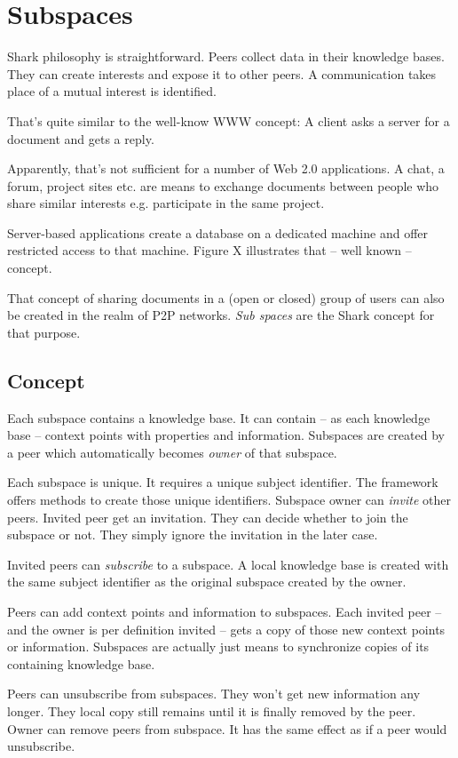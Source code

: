\chapter{Subspaces}
Shark philosophy is straightforward. Peers collect data in their
knowledge bases. They can create interests and expose it to other 
peers. A communication takes place of a mutual interest is identified.

That's quite similar to the well-know WWW concept: A client asks a 
server for a document and gets a reply.

Apparently, that's not sufficient for a number of Web 2.0 applications.
A chat, a forum, project sites etc. are means to exchange documents 
between people who share similar interests e.g. participate in the same
project.

Server-based applications create a database on a dedicated machine
and offer restricted access to that machine. Figure X illustrates that
-- well known -- concept.

That concept of sharing documents in a (open or closed) group 
of users can also be created in the realm of P2P networks. 
{\it Sub spaces} are the Shark concept for that purpose.

\section{Concept}
Each subspace contains a knowledge base. It can contain -- as each knowledge base -- context points with properties and information. Subspaces are created by a peer which automatically becomes {\it owner} of that subspace. 

Each subspace is unique. It requires a unique subject identifier. The framework offers methods to create those unique identifiers. Subspace owner can {\it invite} other peers. Invited peer get an invitation. They can decide whether to join the subspace or not. They simply ignore the invitation in the later case.

Invited peers can {\it subscribe} to a subspace. A local knowledge base is created with the same subject identifier as the original subspace created by
the owner. 

Peers can add context points and information to subspaces. Each invited peer -- and the owner is per definition invited -- gets a copy of those new context points or information. Subspaces are actually just means to synchronize copies of its containing knowledge base.

Peers can unsubscribe from subspaces. They won't get new information any longer. They local copy still remains until it is finally removed by the peer. Owner can remove peers from subspace. It has the same effect as if a peer 
would unsubscribe.


